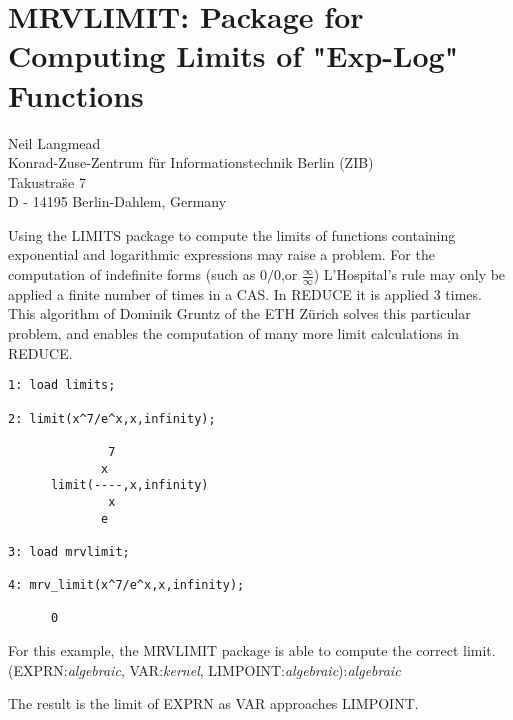 \chapter[MRVLIMIT: Limits of ``exp-log'' functions]%
{MRVLIMIT: Package for Computing Limits of "Exp-Log" Functions}
\label{MRVLIMIT}

{\footnotesize
\begin{center}
Neil Langmead \\
Konrad-Zuse-Zentrum f\"ur Informationstechnik Berlin (ZIB) \\
Takustra\"se 7 \\
D - 14195 Berlin-Dahlem, Germany \\
\end{center}
}

Using the LIMITS package to compute the limits of functions containing
exponential and logarithmic expressions may raise a problem. For the computation
of indefinite forms (such as $0/0$,or $\frac{\infty}{\infty}$) L'Hospital's 
rule may only be applied a finite number of times in a CAS. In REDUCE it is 
applied 3 times. This algorithm of Dominik Gruntz of the ETH Z\"urich
solves this particular problem, and enables the computation of many more
limit calculations in REDUCE.


\begin{verbatim}
1: load limits;

2: limit(x^7/e^x,x,infinity);

              7
             x
      limit(----,x,infinity)
              x
             e

3: load mrvlimit;

4: mrv_limit(x^7/e^x,x,infinity);

      0
\end{verbatim}

For this example, the MRVLIMIT package is able to compute the correct limit. \\
\vspace{.1in}
(EXPRN:{\em algebraic}, VAR:{\em kernel},
LIMPOINT:{\em algebraic}):{\em algebraic}  \par
The result is the limit of EXPRN as VAR approaches LIMPOINT. 
\vspace{.1in}

